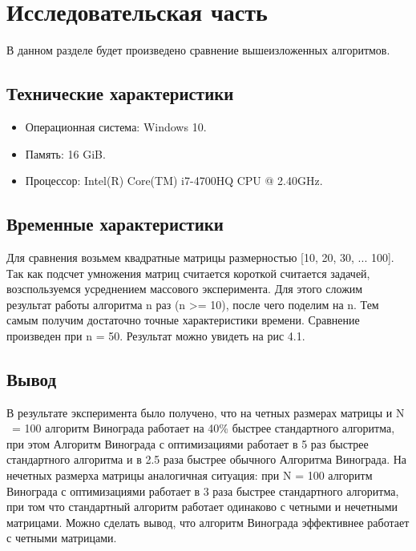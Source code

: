 \chapter{Исследовательская часть}

В данном разделе будет произведено сравнение вышеизложенных алгоритмов.

\section{Технические характеристики}

\begin{itemize}
	\item Операционная система: Windows 10. \cite{windows}
	\item Память: 16 GiB.
	\item Процессор: Intel(R) Core(TM) i7-4700HQ CPU @ 2.40GHz. \cite{intel}
\end{itemize}


\section{Временные характеристики}

Для сравнения возьмем квадратные матрицы размерностью [10, 20, 30, ... 100]. Так как подсчет умножения матриц считается короткой считается задачей, возспользуемся усреднением массового эксперимента. Для этого сложим результат работы алгоритма n раз (n >= 10), после чего поделим на n. Тем самым получим достаточно точные характеристики времени. Сравнение произведен при n = 50. Результат можно увидеть на рис 4.1.

\clearpage
{}
\clearpage
{}


\section*{Вывод}
В результате эксперимента было получено, что на четных размерах матрицы и N ~= 100 алгоритм Винограда работает на 40\% быстрее стандартного алгоритма, при этом Алгоритм Винограда с оптимизациями работает в 5 раз быстрее стандартного алгоритма и в 2.5 раза быстрее обычного Алгоритма Винограда.   
На нечетных размерха матрицы аналогичная ситуация: при N = 100 алгоритм Винограда с оптимизациями работает в 3 раза быстрее стандартного алгоритма, при том что стандартный алгоритм работает одинаково с четными и нечетными матрицами. Можно сделать вывод, что алгоритм Винограда эффективнее работает с четными матрицами.
